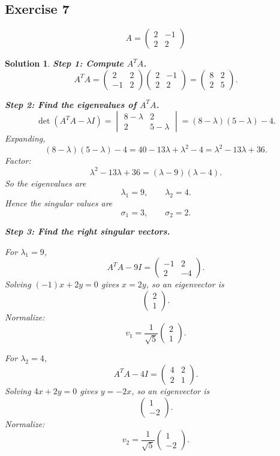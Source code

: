 \documentclass[11pt,a4paper]{article}
\theoremstyle{sol}
\newtheorem*{solution}{Solution}
\begin{document}
\clearpage
\subsection*{Exercise 7}
\[
A=\begin{pmatrix}2&-1\\2&2\end{pmatrix}
\]

\begin{solution}
\textbf{Step 1: Compute $A^TA$.}
\[
A^TA=
\begin{pmatrix}2&2\\-1&2\end{pmatrix}
\begin{pmatrix}2&-1\\2&2\end{pmatrix}
=
\begin{pmatrix}
8&2\\
2&5
\end{pmatrix}.
\]

\textbf{Step 2: Find the eigenvalues of $A^TA$.}
\[
\det(A^TA-\lambda I)
=
\begin{vmatrix}
8-\lambda&2\\
2&5-\lambda
\end{vmatrix}
=(8-\lambda)(5-\lambda)-4.
\]
Expanding,
\[
(8-\lambda)(5-\lambda)-4
=40-13\lambda+\lambda^2-4
=\lambda^2-13\lambda+36.
\]
Factor:
\[
\lambda^2-13\lambda+36=(\lambda-9)(\lambda-4).
\]
So the eigenvalues are
\[
\lambda_1=9,\qquad \lambda_2=4.
\]
Hence the singular values are
\[
\sigma_1=3,\qquad \sigma_2=2.
\]

\textbf{Step 3: Find the right singular vectors.}

For $\lambda_1=9$,
\[
A^TA-9I=
\begin{pmatrix}
-1&2\\
2&-4
\end{pmatrix}.
\]
Solving $(-1)x+2y=0$ gives $x=2y$, so an eigenvector is
\[
\begin{pmatrix}2\\1\end{pmatrix}.
\]
Normalize:
\[
v_1=\frac{1}{\sqrt5}\begin{pmatrix}2\\1\end{pmatrix}.
\]

For $\lambda_2=4$,
\[
A^TA-4I=
\begin{pmatrix}
4&2\\
2&1
\end{pmatrix}.
\]
Solving $4x+2y=0$ gives $y=-2x$, so an eigenvector is
\[
\begin{pmatrix}1\\-2\end{pmatrix}.
\]
Normalize:
\[
v_2=\frac{1}{\sqrt5}\begin{pmatrix}1\\-2\end{pmatrix}.
\]


\end{solution}
\end{document}

